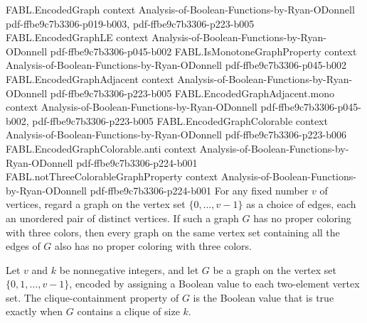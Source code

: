 \begin{theorem}
  {FABL.EncodedGraph}
  {context}
  {Analysis-of-Boolean-Functions-by-Ryan-ODonnell}
  {pdf-ffbe9c7b3306-p019-b003,
    pdf-ffbe9c7b3306-p223-b005}
\proofstep
  {FABL.EncodedGraphLE}
  {context}
  {Analysis-of-Boolean-Functions-by-Ryan-ODonnell}
  {pdf-ffbe9c7b3306-p045-b002}
\proofstep
  {FABL.IsMonotoneGraphProperty}
  {context}
  {Analysis-of-Boolean-Functions-by-Ryan-ODonnell}
  {pdf-ffbe9c7b3306-p045-b002}
\proofstep
  {FABL.EncodedGraphAdjacent}
  {context}
  {Analysis-of-Boolean-Functions-by-Ryan-ODonnell}
  {pdf-ffbe9c7b3306-p223-b005}
\proofstep
  {FABL.EncodedGraphAdjacent.mono}
  {context}
  {Analysis-of-Boolean-Functions-by-Ryan-ODonnell}
  {pdf-ffbe9c7b3306-p045-b002,
    pdf-ffbe9c7b3306-p223-b005}
\proofstep
  {FABL.EncodedGraphColorable}
  {context}
  {Analysis-of-Boolean-Functions-by-Ryan-ODonnell}
  {pdf-ffbe9c7b3306-p223-b006}
\proofstep
  {FABL.EncodedGraphColorable.anti}
  {context}
  {Analysis-of-Boolean-Functions-by-Ryan-ODonnell}
  {pdf-ffbe9c7b3306-p224-b001}
\proofstep
  {FABL.notThreeColorableGraphProperty}
  {context}
  {Analysis-of-Boolean-Functions-by-Ryan-ODonnell}
  {pdf-ffbe9c7b3306-p224-b001}
For any fixed number $v$ of vertices, regard a graph on the vertex set
$\{0,\ldots,v-1\}$ as a choice of edges, each an unordered pair of distinct vertices. If
such a graph $G$ has no proper coloring with three colors, then every graph on the same
vertex set containing all the edges of $G$ also has no proper coloring with three
colors.
\end{theorem}

\begin{definition}
\label{FABL.containsCliqueGraphProperty}
\leanok
{}
Let $v$ and $k$ be nonnegative integers, and let $G$ be a graph on the vertex set
$\{0,1,\ldots,v-1\}$, encoded by assigning a Boolean value to each two-element vertex
set. The clique-containment property of $G$ is the Boolean value that is true exactly
when $G$ contains a clique of size $k$.
\end{definition}

